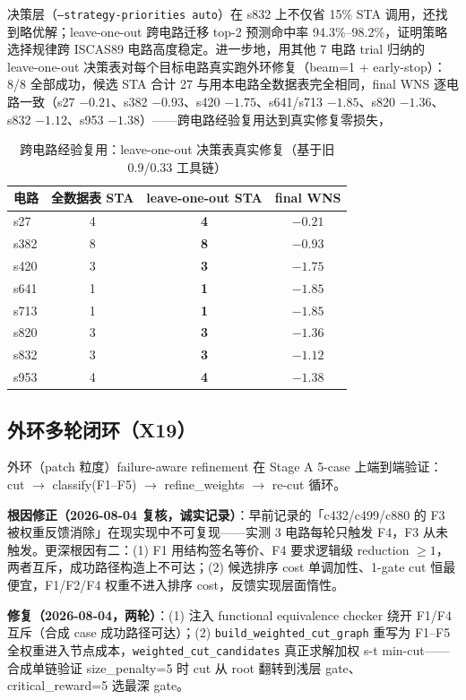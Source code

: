 \documentclass[journal]{IEEEtran}
\begin{document}
决策层（\texttt{--strategy-priorities auto}）在 s832 上不仅省 15\% STA 调用，还找到略优解；leave-one-out 跨电路迁移 top-2 预测命中率 94.3\%--98.2\%，证明策略选择规律跨 ISCAS89 电路高度稳定。进一步地，用其他 7 电路 trial 归纳的 leave-one-out 决策表对每个目标电路真实跑外环修复（beam=1 + early-stop）：8/8 全部成功，候选 STA 合计 27 与用本电路全数据表完全相同，final WNS 逐电路一致（s27 $-0.21$、s382 $-0.93$、s420 $-1.75$、s641/s713 $-1.85$、s820 $-1.36$、s832 $-1.12$、s953 $-1.38$）——跨电路经验复用达到真实修复零损失，
\begin{table}[!t]
\centering
\caption{跨电路经验复用：leave-one-out 决策表真实修复（基于旧 0.9/0.33 工具链）}
\label{tab:loocv_real}
\scriptsize
\setlength{\tabcolsep}{4pt}
\begin{tabular}{lccc}
\toprule
\textbf{电路} & \textbf{全数据表 STA} & \textbf{leave-one-out STA} & \textbf{final WNS} \\
\midrule
s27  & 4 & \textbf{4} & $-0.21$ \\
s382 & 8 & \textbf{8} & $-0.93$ \\
s420 & 3 & \textbf{3} & $-1.75$ \\
s641 & 1 & \textbf{1} & $-1.85$ \\
s713 & 1 & \textbf{1} & $-1.85$ \\
s820 & 3 & \textbf{3} & $-1.36$ \\
s832 & 3 & \textbf{3} & $-1.12$ \\
s953 & 4 & \textbf{4} & $-1.38$ \\
\bottomrule
\end{tabular}
\end{table}

\subsection{外环多轮闭环（X19）}

外环（patch 粒度）failure-aware refinement 在 Stage A 5-case 上端到端验证：cut $\rightarrow$ classify(F1--F5) $\rightarrow$ refine\_weights $\rightarrow$ re-cut 循环。

\textbf{根因修正（2026-08-04 复核，诚实记录）}：早前记录的「c432/c499/c880 的 F3 被权重反馈消除」在现实现中不可复现——实测 3 电路每轮只触发 F4，F3 从未触发。更深根因有二：(1) F1 用结构签名等价、F4 要求逻辑级 reduction $\geq 1$，两者互斥，成功路径构造上不可达；(2) 候选排序 cost 单调加性、1-gate cut 恒最便宜，F1/F2/F4 权重不进入排序 cost，反馈实现层面惰性。

\textbf{修复（2026-08-04，两轮）}：(1) 注入 functional equivalence checker 绕开 F1/F4 互斥（合成 case 成功路径可达）；(2) \texttt{build\_weighted\_cut\_graph} 重写为 F1--F5 全权重进入节点成本，\texttt{weighted\_cut\_candidates} 真正求解加权 s-t min-cut——合成单链验证 size\_penalty=5 时 cut 从 root 翻转到浅层 gate、critical\_reward=5 选最深 gate。
\end{document}
